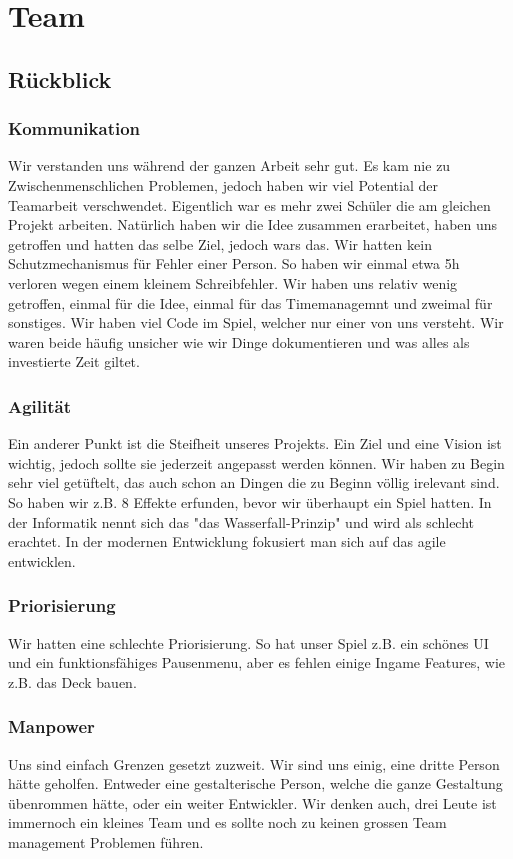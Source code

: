 \chapter{Team}

\section{Rückblick}

\subsection*{Kommunikation}
Wir verstanden uns während der ganzen Arbeit sehr gut.
Es kam nie zu Zwischenmenschlichen Problemen, jedoch haben wir viel Potential der Teamarbeit verschwendet.
Eigentlich war es mehr zwei Schüler die am gleichen Projekt arbeiten.
Natürlich haben wir die Idee zusammen erarbeitet, haben uns getroffen und hatten das selbe Ziel, jedoch wars das.
Wir hatten kein Schutzmechanismus für Fehler einer Person.
So haben wir einmal etwa 5h verloren wegen einem kleinem Schreibfehler.
Wir haben uns relativ wenig getroffen, einmal für die Idee, einmal für das Timemanagemnt und zweimal für sonstiges.
Wir haben viel Code im Spiel, welcher nur einer von uns versteht.
Wir waren beide häufig unsicher wie wir Dinge dokumentieren und was alles als investierte Zeit giltet.

\subsection*{Agilität}
Ein anderer Punkt ist die Steifheit unseres Projekts.
Ein Ziel und eine Vision ist wichtig, jedoch sollte sie jederzeit angepasst werden können.
Wir haben zu Begin sehr viel getüftelt, das auch schon an Dingen die zu Beginn völlig irelevant sind.
So haben wir z.B. 8 Effekte erfunden, bevor wir überhaupt ein Spiel hatten.
In der Informatik nennt sich das "das Wasserfall-Prinzip" und wird als schlecht erachtet.
In der modernen Entwicklung fokusiert man sich auf das agile entwicklen.

\subsection*{Priorisierung}
Wir hatten eine schlechte Priorisierung.
So hat unser Spiel z.B. ein schönes UI und ein funktionsfähiges Pausenmenu, aber es fehlen einige Ingame Features, wie z.B. das Deck bauen.

\subsection*{Manpower}
Uns sind einfach Grenzen gesetzt zuzweit.
Wir sind uns einig, eine dritte Person hätte geholfen.
Entweder eine gestalterische Person, welche die ganze Gestaltung übenrommen hätte, oder ein weiter Entwickler.
Wir denken auch, drei Leute ist immernoch ein kleines Team und es sollte noch zu keinen grossen Team management Problemen führen.

